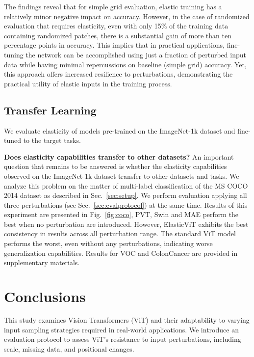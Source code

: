 \documentclass[10pt,twocolumn,letterpaper]{article}
\newcommand{\ours}[0]{ElasticViT\xspace}
\begin{document}
The findings reveal that for simple grid evaluation, elastic training has a relatively minor negative impact on accuracy. However, in the case of randomized evaluation that requires elasticity, even with only 15\% of the training data containing randomized patches, there is a substantial gain of more than ten percentage points in accuracy. This implies that in practical applications, fine-tuning the network can be accomplished using just a fraction of perturbed input data while having minimal repercussions on baseline (simple grid) accuracy. Yet, this approach offers increased resilience to perturbations, demonstrating the practical utility of elastic inputs in the training process.

\subsection{Transfer Learning}

We evaluate elasticity of models pre-trained on the ImageNet-1k dataset and fine-tuned to the target tasks.

\textbf{Does elasticity capabilities transfer to other datasets?}
\label{sec:transfer-learning}
An important question that remains to be answered is whether the elasticity capabilities observed on the ImageNet-1k dataset transfer to other datasets and tasks. We analyze this problem on the matter of multi-label classification of the MS COCO 2014 dataset as described in Sec.~\ref{sec:setup}. We perform evaluation applying all three perturbations (see Sec.~\ref{sec:evalprotocol}) at the same time. Results of this experiment are presented in Fig.~\ref{fig:coco}, PVT, Swin and MAE perform the best when no perturbation are introduced. However, \ours{} exhibits the best consistency in results across all perturbation range. The standard ViT model performs the worst, even without any perturbations, indicating worse generalization capabilities. Results for VOC and ColonCancer are provided in supplementary materials. 

% 

\section{Conclusions}
This study examines Vision Transformers (ViT) and their adaptability to varying input sampling strategies required in real-world applications. We introduce an evaluation protocol to assess ViT's resistance to input perturbations, including scale, missing data, and positional changes.
\end{document}
